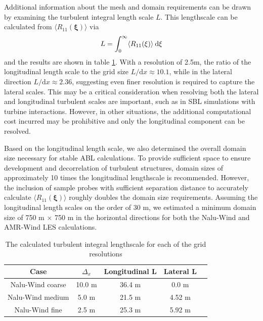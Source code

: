 Additional information about the mesh and domain requirements can be
drawn by examining the turbulent integral length scale $L$.  This
lengthscale can be calculated from $\langle R_{11}(\boldsymbol{\xi})
\rangle$ via
\begin{equation}
  L = \int_0^\infty \langle R_{11}(\xi) \rangle \: {\textrm d}\xi
\end{equation}
and the results are shown in table \ref{tab:GridStudyLscale}.  With a
resolution of 2.5m, the ratio of the longitudinal length scale to the
grid size $L/\textrm{d}x \approx 10.1$, while in the lateral direction
$L/\textrm{d}x \approx 2.36$, suggesting even finer resolution is
required to capture the lateral scales.  This may be a critical
consideration when resolving both the lateral and longitudinal
turbulent scales are important, such as in SBL simulations with
turbine interactions.  However, in other situations, the additional
computational cost incurred may be prohibitive and only the
longitudinal component can be resolved.

Based on the longitudinal length scale, we also determined the
overall domain size necessary for stable ABL calculations.  To provide
sufficient space to ensure development and decorrelation of turbulent
structures, domain sizes of approximately 10 times the longitudinal
lengthscale is recommended.  However, the inclusion of sample probes
with sufficient separation distance to accurately calculate $\langle
R_{11}(\boldsymbol{\xi}) \rangle$ roughly doubles the domain size
requirements.  Assuming the longitudinal length scales on the order of
30 m, we estimated a minimum domain size of 750 m $\times$ 750 m in the
horizontal directions for both the Nalu-Wind and AMR-Wind LES
calculations.

\begin{table} %
\caption{\label{tab:GridStudyLscale} The calculated turbulent integral
  lengthscale for each of the grid resolutions} \centering
\begin{tabular}{ccccc}
  \hline
  Case              & $\Delta_x$ & Longitudinal L  & Lateral L \\
  \hline
  Nalu-Wind coarse  &  10.0 m  & 36.4 m         & 0.0 m     \\
  Nalu-Wind medium  &   5.0 m & 21.5 m         & 4.52 m    \\
  Nalu-Wind fine    &   2.5 m & 25.3 m         & 5.92 m    \\
\hline
\end{tabular}
\end{table}

